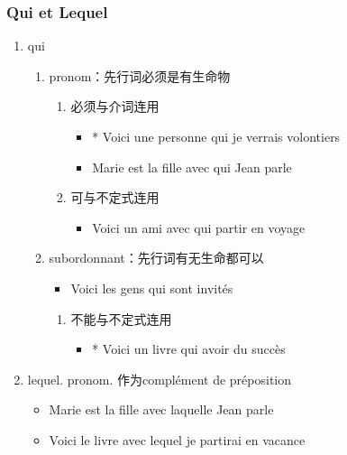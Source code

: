 \documentclass[UTF8]{report}
\begin{document}
\subsubsection{Qui et Lequel}
\begin{enumerate}
    \item qui
    \begin{enumerate}
        \item pronom：先行词必须是有生命物
        \begin{enumerate}
            \item 必须与介词连用
            \begin{itemize}
                \item * Voici une personne qui je verrais volontiers
                \item Marie est la fille avec qui Jean parle
            \end{itemize}
            \item 可与不定式连用
            \begin{itemize}
                \item Voici un ami avec qui partir en voyage
            \end{itemize}
        \end{enumerate}
        \item subordonnant：先行词有无生命都可以
        \begin{itemize}
            \item Voici les gens qui sont invités
        \end{itemize}
        \begin{enumerate}
            \item 不能与不定式连用
            \begin{itemize}
                \item * Voici un livre qui avoir du succès
            \end{itemize}
        \end{enumerate}
    \end{enumerate}
    \item lequel. pronom. 作为complément de préposition
    \begin{itemize}
        \item Marie est la fille avec laquelle Jean parle
        \item Voici le livre avec lequel je partirai en vacance
    \end{itemize}
\end{enumerate}
\end{document}
